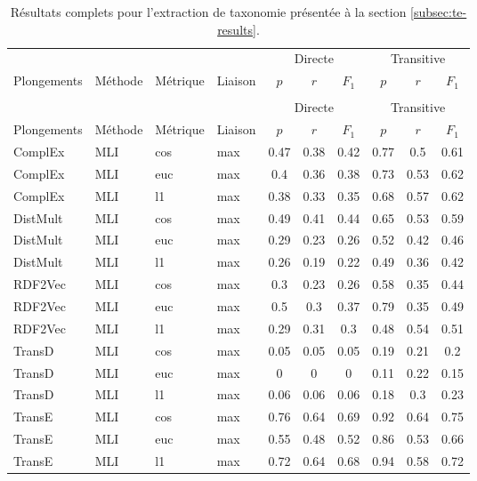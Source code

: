 \begin{longtable}{|llll|ccc|ccc|}
    \caption[Résultats complets pour l'extraction de taxonomie]{Résultats complets pour l'extraction de taxonomie présentée à la section \ref{subsec:te-results}.}
    \label{tab:te-full-results}  \\
    \hline 
	&		&		&		&	\multicolumn{3}{c|}{Directe} & \multicolumn{3}{c|}{Transitive}   \\
Plongements	&	Méthode	&	Métrique	&	Liaison	&	$p$	&	$r$	&	$F_1$	&	$p$	&	$r$	&	$F_1$	\\
\hline \endfirsthead
    \caption[]{Résultats complets pour l'extraction de taxonomie présentée à la section \ref{subsec:te-results}.} \\
    \hline 
	&		&		&		&	\multicolumn{3}{c|}{Directe} & \multicolumn{3}{c|}{Transitive}   \\
Plongements	&	Méthode	&	Métrique	&	Liaison	&	$p$	&	$r$	&	$F_1$	&	$p$	&	$r$	&	$F_1$	\\
\hline \endhead
\hline \endfoot
ComplEx	&	MLI	&	cos	&	max	&	0.47	&	0.38	&	0.42	&	0.77	&	0.5	&	0.61 \\ 
ComplEx	&	MLI	&	euc	&	max	&	0.4	&	0.36	&	0.38	&	0.73	&	0.53	&	0.62 \\ 
ComplEx	&	MLI	&	l1	&	max	&	0.38	&	0.33	&	0.35	&	0.68	&	0.57	&	0.62 \\ 
DistMult	&	MLI	&	cos	&	max	&	0.49	&	0.41	&	0.44	&	0.65	&	0.53	&	0.59 \\ 
DistMult	&	MLI	&	euc	&	max	&	0.29	&	0.23	&	0.26	&	0.52	&	0.42	&	0.46 \\ 
DistMult	&	MLI	&	l1	&	max	&	0.26	&	0.19	&	0.22	&	0.49	&	0.36	&	0.42 \\ 
RDF2Vec	&	MLI	&	cos	&	max	&	0.3	&	0.23	&	0.26	&	0.58	&	0.35	&	0.44 \\ 
RDF2Vec	&	MLI	&	euc	&	max	&	0.5	&	0.3	&	0.37	&	0.79	&	0.35	&	0.49 \\ 
RDF2Vec	&	MLI	&	l1	&	max	&	0.29	&	0.31	&	0.3	&	0.48	&	0.54	&	0.51 \\ 
TransD	&	MLI	&	cos	&	max	&	0.05	&	0.05	&	0.05	&	0.19	&	0.21	&	0.2 \\ 
TransD	&	MLI	&	euc	&	max	&	0	&	0	&	0	&	0.11	&	0.22	&	0.15 \\ 
TransD	&	MLI	&	l1	&	max	&	0.06	&	0.06	&	0.06	&	0.18	&	0.3	&	0.23 \\ 
TransE	&	MLI	&	cos	&	max	&	0.76	&	0.64	&	0.69	&	0.92	&	0.64	&	0.75 \\ 
TransE	&	MLI	&	euc	&	max	&	0.55	&	0.48	&	0.52	&	0.86	&	0.53	&	0.66 \\ 
TransE	&	MLI	&	l1	&	max	&	0.72	&	0.64	&	0.68	&	0.94	&	0.58	&	0.72 \\ 

\end{longtable}
